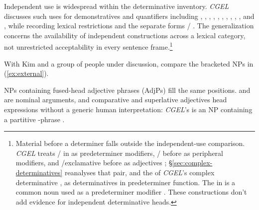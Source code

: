 \documentclass[12pt]{article}
\begin{document}
Independent use is widespread within the determinative inventory. \textit{CGEL} discusses such uses for demonstratives and quantifiers including , , , , , , , , , , and , while recording lexical restrictions and the separate forms / \citep[371--372, 410--424]{huddleston2002}. The generalization concerns the availability of independent constructions across a lexical category, not unrestricted acceptability in every sentence frame.\footnote{Material before a determiner falls outside the independent-use comparison. \textit{CGEL} treats / in  as predeterminer modifiers, / before  as peripheral modifiers, and /exclamative  before  as adjectives \citep[433--437]{huddleston2002}; §\ref{sec:complex-determinatives} reanalyses that pair, and the  of \textit{CGEL}'s complex determinative  \citep[394]{huddleston2002}, as determinatives in predeterminer function. The  in  is a common noun used as a predeterminer modifier \citep[434]{huddleston2002}. These constructions don't add evidence for independent determinative heads.}

With Kim and a group of people under discussion, compare the bracketed NPs in (\ref{ex:external}).

\begin{samepage}

\ea\label{ex:external}
\ea {}\qquad {}\qquad {}
\ex {}\qquad {}\qquad {}
\ex {}\qquad {}\qquad {}
\ex {}\qquad {}\qquad {}
\z\z

\end{samepage}

NPs containing fused-head adjective phrases (AdjPs) fill the same positions.  and  are nominal arguments, and comparative and superlative adjectives head expressions without a generic human interpretation: \textit{CGEL}'s  is an NP containing a partitive -phrase \citep[332--333, 416--423]{huddleston2002}.
\end{document}
